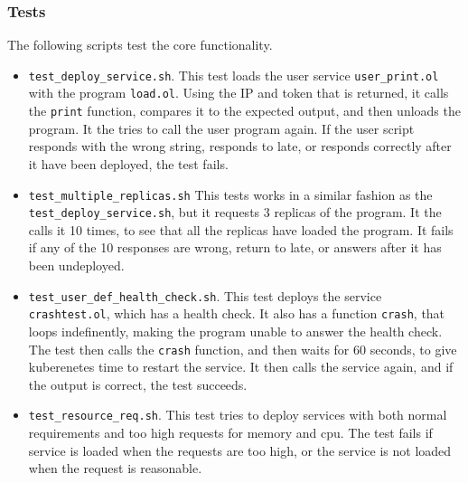 \documentclass[Report.tex]{subfiles}
\begin{document}
\subsubsection{Tests}
The following scripts test the core functionality.
\begin{itemize}
\item {\tt test\_deploy\_service.sh}. This test loads the user service {\tt user\_print.ol} with the program {\tt load.ol}. Using the IP and token that is returned, it calls the {\tt print} function, compares it to the expected output, and then unloads the program. It the tries to call the user program again. If the user script responds with the wrong string, responds to late, or responds correctly after it have been deployed, the test fails.
\item {\tt test\_multiple\_replicas.sh} This tests works in a similar fashion as the {\tt test\_deploy\_service.sh}, but it requests 3 replicas of the program. It the calls it 10 times, to see that all the replicas have loaded the program. It fails if any of the 10 responses are wrong, return to late, or answers after it has been undeployed.
\item {\tt test\_user\_def\_health\_check.sh}. This test deploys the service {\tt crashtest.ol}, which has a health check. It also has a function {\tt crash}, that loops indefinently, making the program unable to answer the health check. The test then calls the {\tt crash} function, and then waits for 60 seconds, to give kuberenetes time to restart the service. It then calls the service again, and if the output is correct, the test succeeds.
\item {\tt test\_resource\_req.sh}. This test tries to deploy services with both normal requirements and too high requests for memory and cpu. The test fails if service is loaded when the requests are too high, or the service is not loaded when the request is reasonable.
\end{itemize}
\end{document}
